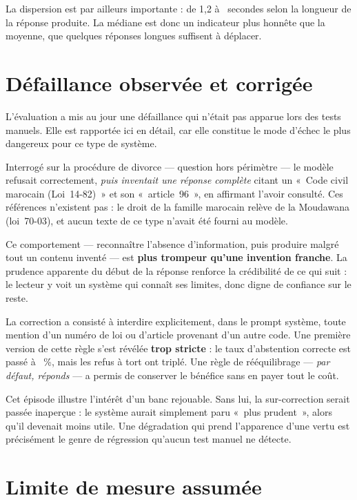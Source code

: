 La dispersion est par ailleurs importante : de 1,2 à \LatMax~secondes selon la longueur de la
réponse produite. La médiane est donc un indicateur plus honnête que la moyenne, que quelques
réponses longues suffisent à déplacer.

\section{Défaillance observée et corrigée}
\label{sec:hallucination}

L'évaluation a mis au jour une défaillance qui n'était pas apparue lors des tests manuels. Elle
est rapportée ici en détail, car elle constitue le mode d'échec le plus dangereux pour ce type de
système.

Interrogé sur la procédure de divorce --- question hors périmètre --- le modèle refusait
correctement, \emph{puis inventait une réponse complète} citant un «~Code civil marocain
(Loi~14-82)~» et son «~article~96~», en affirmant l'avoir consulté. Ces références n'existent
pas : le droit de la famille marocain relève de la Moudawana (loi~70-03), et aucun texte de ce
type n'avait été fourni au modèle.

\begin{limite}
Ce comportement --- reconnaître l'absence d'information, puis produire malgré tout un contenu
inventé --- est \textbf{plus trompeur qu'une invention franche}. La prudence apparente du début de
la réponse renforce la crédibilité de ce qui suit : le lecteur y voit un système qui connaît ses
limites, donc digne de confiance sur le reste.
\end{limite}

La correction a consisté à interdire explicitement, dans le prompt système, toute mention d'un
numéro de loi ou d'article provenant d'un autre code. Une première version de cette règle s'est
révélée \textbf{trop stricte} : le taux d'abstention correcte est passé à \TauxAbstention~\%, mais
les refus à tort ont triplé. Une règle de rééquilibrage --- \emph{par défaut, réponds} --- a permis
de conserver le bénéfice sans en payer tout le coût.

Cet épisode illustre l'intérêt d'un banc rejouable. Sans lui, la sur-correction serait passée
inaperçue : le système aurait simplement paru «~plus prudent~», alors qu'il devenait moins utile.
Une dégradation qui prend l'apparence d'une vertu est précisément le genre de régression qu'aucun
test manuel ne détecte.

\section{Limite de mesure assumée}

